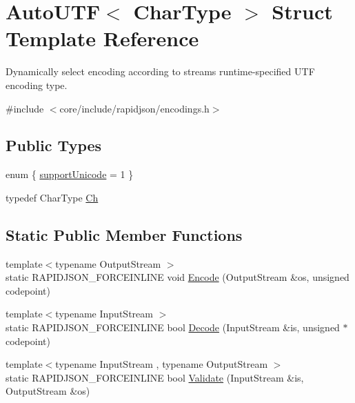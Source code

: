 \hypertarget{structAutoUTF}{}\section{Auto\+U\+TF$<$ Char\+Type $>$ Struct Template Reference}
\label{structAutoUTF}


Dynamically select encoding according to stream\textquotesingle{}s runtime-\/specified U\+TF encoding type.  




{\ttfamily \#include $<$core/include/rapidjson/encodings.\+h$>$}

\subsection*{Public Types}
\begin{DoxyCompactItemize}
\item 
enum \{ \hyperlink{structAutoUTF_a678e20a7f8d022be68adbb49fa56a094adc86ae046cd64f591495ac635a5c04c2}{support\+Unicode} = 1
 \}
\item 
typedef Char\+Type \hyperlink{structAutoUTF_a0609343de776df3bc31b4c980eb3cf1c}{Ch}
\end{DoxyCompactItemize}
\subsection*{Static Public Member Functions}
\begin{DoxyCompactItemize}
\item 
{\footnotesize template$<$typename Output\+Stream $>$ }\\static R\+A\+P\+I\+D\+J\+S\+O\+N\+\_\+\+F\+O\+R\+C\+E\+I\+N\+L\+I\+NE void \hyperlink{structAutoUTF_a414946115261f886e74dd42cb4b98781}{Encode} (Output\+Stream \&os, unsigned codepoint)
\item 
{\footnotesize template$<$typename Input\+Stream $>$ }\\static R\+A\+P\+I\+D\+J\+S\+O\+N\+\_\+\+F\+O\+R\+C\+E\+I\+N\+L\+I\+NE bool \hyperlink{structAutoUTF_aa5e3c1dc23dbb75f6442ff69500a35b0}{Decode} (Input\+Stream \&is, unsigned $\ast$codepoint)
\item 
{\footnotesize template$<$typename Input\+Stream , typename Output\+Stream $>$ }\\static R\+A\+P\+I\+D\+J\+S\+O\+N\+\_\+\+F\+O\+R\+C\+E\+I\+N\+L\+I\+NE bool \hyperlink{structAutoUTF_a36dd6f226d6a07c12161e21c0aff20b1}{Validate} (Input\+Stream \&is, Output\+Stream \&os)
\end{DoxyCompactItemize}


